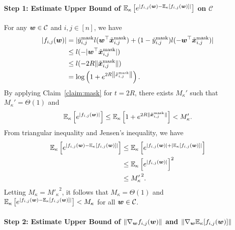 \paragraph{Step 1: Estimate Upper Bound of $\mathbb{E}_\kappa \left[ e^{\left|f_{i,j}({\bm{w}}) - \mathbb{E}_\kappa[f_{i,j}({\bm{w}})]\right|}\right]$ on $\mathcal{C}$ }\quad

For any ${\bm{w}} \in \mathcal{C}$ and $i,j \in [n]$, we have
\begin{align*}
    |f_{i,j}({\bm{w}})| &= |\tilde{y}_{i,j}^\mathrm{mask}l({\bm{w}}^\top \tilde{{\bm{x}}}_{i,j}^\mathrm{mask}) + (1-\tilde{y}_{i,j}^\mathrm{mask})l(-{\bm{w}}^\top \tilde{{\bm{x}}}_{i,j}^\mathrm{mask})|\\
    &\leq l(-|{\bm{w}}^\top \tilde{{\bm{x}}}_{i,j}^\mathrm{mask}|)\\
    &\leq l(-2R \lVert \tilde{{\bm{x}}}_{i,j}^\mathrm{mask} \rVert)\\
    &= \log \left( 1+e^{2R\left\lVert \tilde{x}_{i,j}^\mathrm{mask} \right\rVert} \right).
\end{align*}
By applying Claim~\ref{claim:mask} for $t = 2R$, there exists $M_\kappa'$ such that $M_\kappa' = \Theta(1)$ and
\begin{equation*}
    \mathbb{E}_\kappa \left[ e^{|f_{i,j}({\bm{w}})|}\right] \leq \mathbb{E}_\kappa \left[ 1+ e^{2R \lVert \tilde{{\bm{x}}}_{i,j}^\mathrm{mask}\rVert} \right]< M_\kappa'.
\end{equation*}
From triangular inequality and Jensen's inequality, we have
\begin{align*}
\mathbb{E}_\kappa \left[ e^{\left|f_{i,j}({\bm{w}}) - \mathbb{E}_\kappa[f_{i,j}({\bm{w}})]\right|}\right] 
&\leq \mathbb{E}_\kappa \left[ e^{\left|f_{i,j}({\bm{w}})\right| + \left|\mathbb{E}_\kappa[f_{i,j}({\bm{w}})]\right|}\right]\\
&\leq \mathbb{E}_\kappa \left[ e^{\left|f_{i,j}({\bm{w}})\right| }\right]^2\\
&\leq {M_\kappa'}^2.
\end{align*}
Letting $M_\kappa = {M'_\kappa}^2$, it follows that $M_\kappa = \Theta(1)$ and $\mathbb{E}_\kappa \left[ e^{\left|f_{i,j}({\bm{w}}) - \mathbb{E}_\kappa[f_{i,j}({\bm{w}})]\right|}\right] < M_\kappa$ for all ${\bm{w}} \in \mathcal{C}$.

\paragraph{Step 2: Estimate Upper Bound of $\lVert \nabla_{\bm{w}} f_{i,j}({\bm{w}})\rVert$ and $\lVert \nabla_{\bm{w}} \mathbb{E}_\kappa[f_{i,j}({\bm{w}})]\rVert$} \quad

